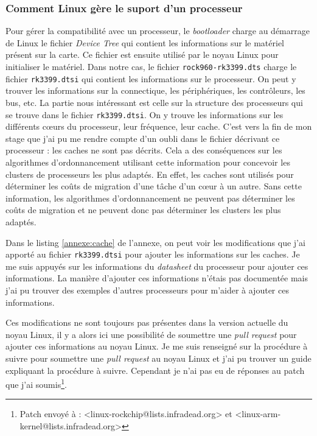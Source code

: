 \subsubsection{Comment Linux gère le suport d'un processeur}

Pour gérer la compatibilité avec un processeur, le \textit{bootloader} charge au démarrage de Linux le fichier \textit{Device Tree} qui contient les informations sur le matériel présent sur la carte. Ce fichier est ensuite utilisé par le noyau Linux pour initialiser le matériel. Dans notre cas, le fichier \texttt{rock960-rk3399.dts} charge le fichier \texttt{rk3399.dtsi} qui contient les informations sur le processeur. On peut y trouver les informations sur la connectique, les périphériques, les contrôleurs, les bus, etc.
La partie nous intéressant est celle sur la structure des processeurs qui se trouve dans le fichier \texttt{rk3399.dtsi}. On y trouve les informations sur les différents cœurs du processeur, leur fréquence, leur cache. C'est vers la fin de mon stage que j'ai pu me rendre compte d'un oubli dans le fichier décrivant ce processeur : les caches ne sont pas décrits. Cela a des conséquences sur les algorithmes d'ordonnancement utilisant cette information pour concevoir les clusters de processeurs les plus adaptés. En effet, les caches sont utilisés pour déterminer les coûts de migration d'une tâche d'un cœur à un autre. Sans cette information, les algorithmes d'ordonnancement ne peuvent pas déterminer les coûts de migration et ne peuvent donc pas déterminer les clusters les plus adaptés. 

Dans le listing \ref{annexe:cache} de l'annexe, on peut voir les modifications que j'ai apporté au fichier \texttt{rk3399.dtsi} pour ajouter les informations sur les caches. Je me suis appuyés sur les informations du \textit{datasheet} du processeur pour ajouter ces informations. La manière d'ajouter ces informations n'étais pas documentée mais j'ai pu trouver des exemples d'autres processeurs pour m'aider à ajouter ces informations.

Ces modifications ne sont toujours pas présentes dans la version actuelle du noyau Linux, il y a alors ici une possibilité de soumettre une \textit{pull request} pour ajouter ces informations au noyau Linux. Je me suis renseigné sur la procédure à suivre pour soumettre une \textit{pull request} au noyau Linux et j'ai pu trouver un guide\cite{kernel-contribute} expliquant la procédure à suivre. Cependant je n'ai pas eu de réponses au patch que j'ai soumis\footnote{Patch envoyé à : <linux-rockchip@lists.infradead.org> et <linux-arm-kernel@lists.infradead.org>}.


